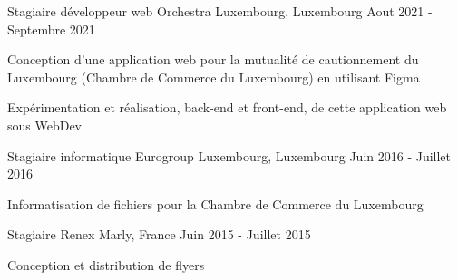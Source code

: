 
\begin{cventries}
  \cventry
    {Stagiaire développeur web} %
    {Orchestra} %
    {Luxembourg, Luxembourg} %
    {Aout 2021 - Septembre 2021} %
    {
      \begin{cvitems} %
        \item {Conception d'une application web pour la mutualité de cautionnement du Luxembourg (Chambre de Commerce du Luxembourg) en utilisant Figma}
        \item {Expérimentation et réalisation, back-end et front-end, de cette application web sous WebDev}
      \end{cvitems}
    }

  \cventry
    {Stagiaire informatique} %
    {Eurogroup} %
    {Luxembourg, Luxembourg} %
    {Juin 2016 - Juillet 2016} %
    {
      \begin{cvitems} %
        \item {Informatisation de fichiers pour la Chambre de Commerce du Luxembourg}
      \end{cvitems}
    }

  \cventry
    {Stagiaire} %
    {Renex} %
    {Marly, France} %
    {Juin 2015 - Juillet 2015} %
    {
      \begin{cvitems} %
        \item {Conception et distribution de flyers}
      \end{cvitems}
    }

\end{cventries}
